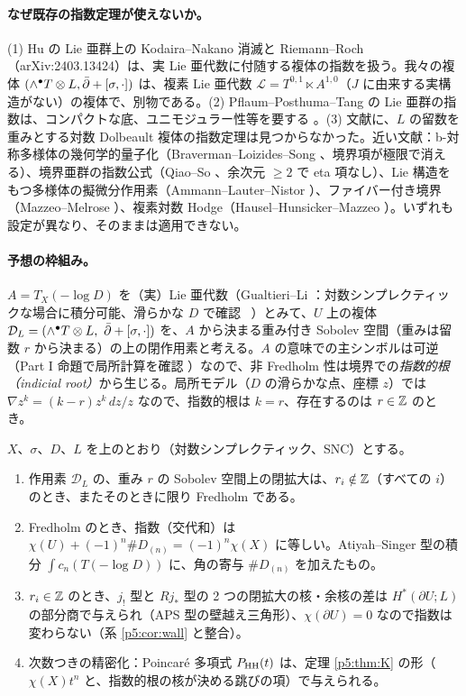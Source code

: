 \paragraph{なぜ既存の指数定理が使えないか。}(1) Hu の Lie 亜群上の Kodaira--Nakano 消滅と Riemann--Roch（arXiv:2403.13424）\cite{Hu2}は、実 Lie 亜代数に付随する複体の指数を扱う。我々の複体 $(\wedge^\bullet T\otimes L,\bar\partial+[\sigma,\cdot])$ は、複素 Lie 亜代数 $\mathcal L=T^{0,1}\ltimes A^{1,0}$（$J$ に由来する実構造がない）の複体で、別物である。(2) Pflaum--Posthuma--Tang \cite{PPT} の Lie 亜群の指数は、コンパクトな底、ユニモジュラー性等を要する \tQ。(3) 文献に、$L$ の留数を重みとする対数 Dolbeault 複体の指数定理は見つからなかった。近い文献：b-対称多様体の幾何学的量子化（Braverman--Loizides--Song \cite{BLS}、境界項が極限で消える）、境界亜群の指数公式（Qiao--So \cite{QS}、余次元 $\ge2$ で eta 項なし）、Lie 構造をもつ多様体の擬微分作用素（Ammann--Lauter--Nistor \cite{ALN}）、ファイバー付き境界（Mazzeo--Melrose \cite{MM}）、複素対数 Hodge（Hausel--Hunsicker--Mazzeo \cite{HHM}）。いずれも設定が異なり、そのままは適用できない。

\paragraph{予想の枠組み。}$A=T_X(-\log D)$ を（実）Lie 亜代数（Gualtieri--Li \cite{GL}：対数シンプレクティックな場合に積分可能、滑らかな $D$ で確認 \tC\ \tQ）とみて、$U$ 上の複体 $\mathcal D_L=(\wedge^\bullet T\otimes L,\ \bar\partial+[\sigma,\cdot])$ を、$A$ から決まる重み付き Sobolev 空間（重みは留数 $r$ から決まる）の上の閉作用素と考える。$A$ の意味での主シンボルは可逆（Part I 命題で局所計算を確認 \tV）なので、非 Fredholm 性は境界での\emph{指数的根（indicial root）}から生じる。局所モデル（$D$ の滑らかな点、座標 $z$）では $\nabla z^k=(k-r)z^k\,dz/z$ なので、指数的根は $k=r$、存在するのは $r\in\mathbb Z$ のとき。

\begin{conj}[指数予想\ \tK]\label{p5:conj:index}
$X$、$\sigma$、$D$、$L$ を上のとおり（対数シンプレクティック、SNC）とする。
\begin{enumerate}
\item[(I1)] 作用素 $\mathcal D_L$ の、重み $r$ の Sobolev 空間上の閉拡大は、$r_i\notin\mathbb Z$（すべての $i$）のとき、またそのときに限り Fredholm である。
\item[(I2)] Fredholm のとき、指数（交代和）は $\chi(U)+(-1)^n\#D_{(n)}=(-1)^n\chi(X)$ に等しい。Atiyah--Singer 型の積分 $\int c_n(T(-\log D))$ に、角の寄与 $\#D_{(n)}$ を加えたもの。
\item[(I3)] $r_i\in\mathbb Z$ のとき、$j_!$ 型と $Rj_*$ 型の 2 つの閉拡大の核・余核の差は $H^*(\partial U;L)$ の部分商で与えられ（APS 型の壁越え三角形）、$\chi(\partial U)=0$ なので指数は変わらない（系 \ref{p5:cor:wall} と整合）。
\item[(I4)] 次数つきの精密化：Poincar\'e 多項式 $P_{\mathrm{HH}}(t)$ は、定理 \ref{p5:thm:K} の形（$\chi(X)t^n$ と、指数的根の核が決める跳びの項）で与えられる。
\end{enumerate}
\end{conj}
